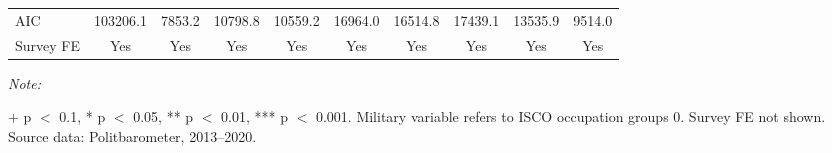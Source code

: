 \begin{table}[!h]
{\begin{threeparttable}
\begin{tabular}[t]{lccccccccc}
AIC & \num{103206.1} & \num{7853.2} & \num{10798.8} & \num{10559.2} & \num{16964.0} & \num{16514.8} & \num{17439.1} & \num{13535.9} & \num{9514.0}\\
Survey FE & Yes & Yes & Yes & Yes & Yes & Yes & Yes & Yes & Yes\\
\bottomrule
\end{tabular}
\begin{tablenotes}[para]
\item \textit{Note: } 
\item + p $<$ 0.1, * p $<$ 0.05, ** p $<$ 0.01, *** p $<$ 0.001. Military variable refers to ISCO occupation groups 0. Survey FE not shown. Source data: Politbarometer, 2013--2020.
\end{tablenotes}
\end{threeparttable}}
\end{table}
